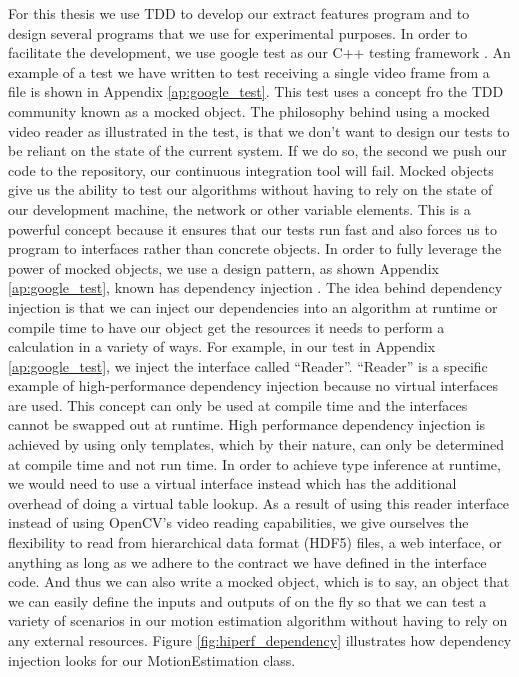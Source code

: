 For this thesis we use TDD to develop our extract features program and to design
several programs that we use for experimental purposes. In order to facilitate
the development, we use google test as our C++ testing framework
\cite{googletest}. An example of a test we have written to test receiving a
single video frame from a file is shown in Appendix \ref{ap:google_test}. This
test uses a concept fro the TDD community known as a mocked object. The
philosophy behind using a mocked video reader as illustrated in the test, is
that we don't want to design our tests to be reliant on the state of the current
system. If we do so, the second we push our code to the repository, our
continuous integration tool will fail. Mocked objects give us the ability to
test our algorithms without having to rely on the state of our development
machine, the network or other variable elements. This is a powerful concept
because it ensures that our tests run fast and also forces us to program to
interfaces rather than concrete objects. In order to fully leverage the power of
mocked objects, we use a design pattern, as shown Appendix \ref{ap:google_test},
known has dependency injection \cite{gamma1995design}. The idea behind
dependency injection is that we can inject our dependencies into an algorithm at
runtime or compile time to have our object get the resources it needs to perform
a calculation in a variety of ways. For example, in our test in Appendix
\ref{ap:google_test}, we inject the interface called ``Reader''. ``Reader'' is a
specific example of high-performance dependency injection because no virtual
interfaces are used. This concept can only be used at compile time and the
interfaces cannot be swapped out at runtime. High performance dependency
injection is achieved by using only templates, which by their nature, can only
be determined at compile time and not run time. In order to achieve type
inference at runtime, we would need to use a virtual interface instead which has
the additional overhead of doing a virtual table lookup. As a result of using
this reader interface instead of using OpenCV's video reading capabilities, we
give ourselves the flexibility to read from hierarchical data format (HDF5)
files, a web interface, or anything as long as we adhere to the contract we have
defined in the interface code. And thus we can also write a mocked object, which
is to say, an object that we can easily define the inputs and outputs of on the
fly so that we can test a variety of scenarios in our motion estimation
algorithm without having to rely on any external resources. Figure
\ref{fig:hiperf_dependency} illustrates how dependency injection looks for our
MotionEstimation class.

